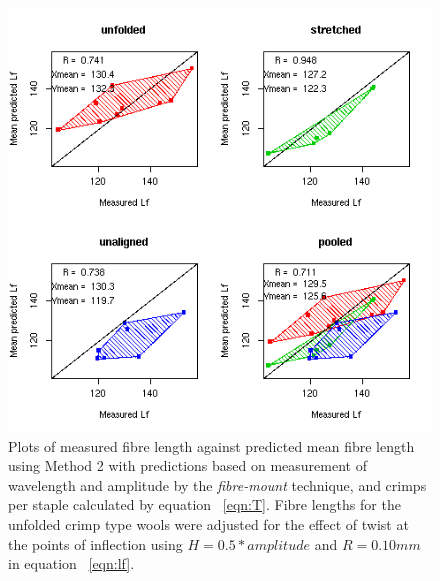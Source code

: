 %

\begin{figure}[!h]
  \centering
  \includegraphics[width=1.1\textwidth]{figfcpredlf.png}
  \caption{Plots of measured fibre length against predicted mean fibre length using Method 2 with predictions based on measurement of wavelength and amplitude by the {\em fibre-mount} technique, and crimps per staple calculated by equation ~\ref{eqn:T}. Fibre lengths for the unfolded crimp type wools were adjusted for the effect of twist at the points of inflection using $H = 0.5 * amplitude$ and $R = 0.10 mm$ in equation ~\ref{eqn:lf}.}
  \label{fig:fcpredlf}
\end{figure}

%

